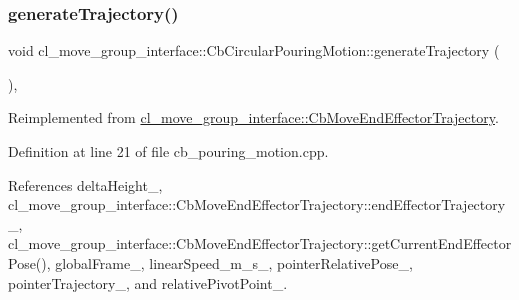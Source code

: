 \subsubsection{\texorpdfstring{generate\+Trajectory()}{generateTrajectory()}}
{\footnotesize\ttfamily void cl\+\_\+move\+\_\+group\+\_\+interface\+::\+Cb\+Circular\+Pouring\+Motion\+::generate\+Trajectory (\begin{DoxyParamCaption}{ }\end{DoxyParamCaption})\hspace{0.3cm}{\ttfamily [override]}, {\ttfamily [virtual]}}



Reimplemented from \hyperlink{classcl__move__group__interface_1_1CbMoveEndEffectorTrajectory_aeae938ab66e18ab7d2fb2427bc83647b}{cl\+\_\+move\+\_\+group\+\_\+interface\+::\+Cb\+Move\+End\+Effector\+Trajectory}.



Definition at line 21 of file cb\+\_\+pouring\+\_\+motion.\+cpp.



References delta\+Height\+\_\+, cl\+\_\+move\+\_\+group\+\_\+interface\+::\+Cb\+Move\+End\+Effector\+Trajectory\+::end\+Effector\+Trajectory\+\_\+, cl\+\_\+move\+\_\+group\+\_\+interface\+::\+Cb\+Move\+End\+Effector\+Trajectory\+::get\+Current\+End\+Effector\+Pose(), global\+Frame\+\_\+, linear\+Speed\+\_\+m\+\_\+s\+\_\+, pointer\+Relative\+Pose\+\_\+, pointer\+Trajectory\+\_\+, and relative\+Pivot\+Point\+\_\+.


